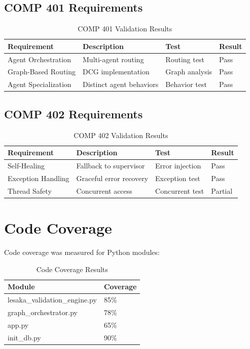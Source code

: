 \begin{enumerate}
\subsection{COMP 401 Requirements}

\begin{table}[H]
\centering
\begin{tabular}{|l|l|l|l|}
\hline
\textbf{Requirement} & \textbf{Description} & \textbf{Test} & \textbf{Result} \\
\hline
Agent Orchestration & Multi-agent routing & Routing test & Pass \\
Graph-Based Routing & DCG implementation & Graph analysis & Pass \\
Agent Specialization & Distinct agent behaviors & Behavior test & Pass \\
\hline
\end{tabular}
\caption{COMP 401 Validation Results}
\end{table}

\subsection{COMP 402 Requirements}

\begin{table}[H]
\centering
\begin{tabular}{|l|l|l|l|}
\hline
\textbf{Requirement} & \textbf{Description} & \textbf{Test} & \textbf{Result} \\
\hline
Self-Healing & Fallback to supervisor & Error injection & Pass \\
Exception Handling & Graceful error recovery & Exception test & Pass \\
Thread Safety & Concurrent access & Concurrent test & Partial \\
\hline
\end{tabular}
\caption{COMP 402 Validation Results}
\end{table}

\section{Code Coverage}

Code coverage was measured for Python modules:

\begin{table}[H]
\centering
\begin{tabular}{|l|l|}
\hline
\textbf{Module} & \textbf{Coverage} \\
\hline
lesaka\_validation\_engine.py & 85\% \\
graph\_orchestrator.py & 78\% \\
app.py & 65\% \\
init\_db.py & 90\% \\
\hline
\end{tabular}
\caption{Code Coverage Results}
\end{table}


\end{enumerate}
